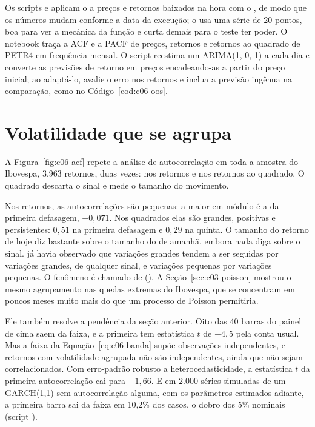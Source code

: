 \begin{repositorio}
Os scripts  e  aplicam o  a preços e retornos baixados na hora com o , de modo que os números mudam conforme a data da execução; o  usa uma série de 20 pontos, boa para ver a mecânica da função e curta demais para o teste ter poder. O notebook  traça a ACF e a PACF de preços, retornos e retornos ao quadrado de PETR4 em frequência mensal. O script  reestima um ARIMA(1, 0, 1) a cada dia e converte as previsões de retorno em preços encadeando-as a partir do preço inicial; ao adaptá-lo, avalie o erro nos retornos e inclua a previsão ingênua na comparação, como no Código~\ref{cod:c06-oos}.
\end{repositorio}

\section{Volatilidade que se agrupa}
\label{sec:c06-garch}

A Figura~\ref{fig:c06-acf} repete a análise de autocorrelação em toda a amostra do Ibovespa, 3.963 retornos, duas vezes: nos retornos e nos retornos ao quadrado. O quadrado descarta o sinal e mede o tamanho do movimento.


Nos retornos, as autocorrelações são pequenas: a maior em módulo é a da primeira defasagem, $-0,071$. Nos quadrados elas são grandes, positivas e persistentes: $0,51$ na primeira defasagem e $0,29$ na quinta. O tamanho do retorno de hoje diz bastante sobre o tamanho do de amanhã, embora nada diga sobre o sinal. \citet{mandelbrot1963} já havia observado que variações grandes tendem a ser seguidas por variações grandes, de qualquer sinal, e variações pequenas por variações pequenas. O fenômeno é chamado de  (). A Seção~\ref{sec:c03-poisson} mostrou o mesmo agrupamento nas quedas extremas do Ibovespa, que se concentram em poucos meses muito mais do que um processo de Poisson permitiria.

Ele também resolve a pendência da seção anterior. Oito das 40 barras do painel de cima saem da faixa, e a primeira tem estatística $t$ de $-4,5$ pela conta usual. Mas a faixa da Equação~\eqref{eq:c06-banda} supõe observações independentes, e retornos com volatilidade agrupada não são independentes, ainda que não sejam correlacionados. Com erro-padrão robusto a heterocedasticidade, a estatística $t$ da primeira autocorrelação cai para $-1,66$. E em 2.000 séries simuladas de um GARCH(1,1) sem autocorrelação alguma, com os parâmetros estimados adiante, a primeira barra sai da faixa em 10,2\% dos casos, o dobro dos 5\% nominais (script ).

